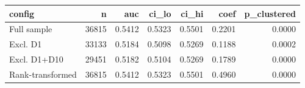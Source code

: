 \begin{tabular}{lrrrrrr}
\toprule
config & n & auc & ci\_lo & ci\_hi & coef & p\_clustered \\
\midrule
Full sample & 36815 & 0.5412 & 0.5323 & 0.5501 & 0.2201 & 0.0000 \\
Excl. D1 & 33133 & 0.5184 & 0.5098 & 0.5269 & 0.1188 & 0.0002 \\
Excl. D1+D10 & 29451 & 0.5182 & 0.5104 & 0.5269 & 0.1789 & 0.0000 \\
Rank-transformed & 36815 & 0.5412 & 0.5323 & 0.5501 & 0.4960 & 0.0000 \\
\bottomrule
\end{tabular}
